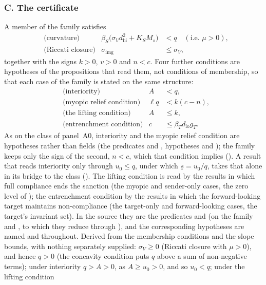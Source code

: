 \subsubsection*{C. The certificate}
A member of the family satisfies
\begin{align*}
&\text{(curvature)}& \beta_S\bigl(\sigma_Vd_{\mathrm{hi}}^2+K_SM_s\bigr)&<q
\quad(\text{i.e. }\mu>0),\\
&\text{(Riccati closure)}& \sigma_{\mathrm{img}}&\le\sigma_V,
\end{align*}
together with the signs $k>0$, $v>0$ and $n<c$. Four further conditions are
hypotheses of the propositions that read them, not conditions of membership,
so that each case of the family is stated on the same structure:
\begin{align*}
&\text{(interiority)}& A&<q,\\
&\text{(myopic relief condition)}& \ell q&<k(c-n),\\
&\text{(the lifting condition)}& A&\le k,\\
&\text{(entrenchment condition)}& c&\le\beta_Td_{\mathrm{lo}}g_T .
\end{align*}
As on the class of panel~A0, interiority and the myopic relief condition are
hypotheses rather than fields (the predicates
 and ,
hypotheses  and ); the family keeps only the sign of the
second, $n<c$, which that condition implies (). A result
that reads interiority only through $u_0\le q$, under which $\underline s=u_0/q$,
takes that alone in
its bridge to the class ().
The lifting condition is read by the results in which full compliance ends the
sanction (the myopic and sender-only cases, the zero level of
); the entrenchment condition by the results in which the
forward-looking target maintains non-compliance (the target-only and forward-looking cases, the
target's invariant set). In the source they are the predicates
 and  (on the family
 and , to which
they reduce through ), and the corresponding hypotheses are named
 and  throughout.
Derived from the membership conditions and the slope bounds, with nothing
separately supplied: $\sigma_V\ge0$ (Riccati closure with $\mu>0$), and hence
$q>0$ (the concavity condition puts $q$ above a sum of non-negative terms); under
interiority $q>A>0$, as $A\ge u_0>0$, and so $u_0<q$; under the lifting condition
